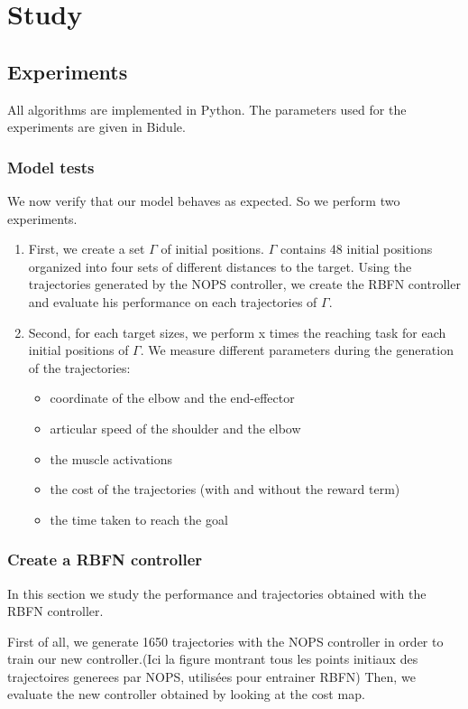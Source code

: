 \documentclass[pdftex,a4paper,11pt]{report}
\begin{document}
\chapter{Study}
\section{Experiments}
All algorithms are implemented in Python. The parameters used for the experiments are given in Bidule.

\subsection{Model tests}
We now verify that our model behaves as expected. So we perform two experiments.
\begin{enumerate}
\item First, we create a set $\Gamma$ of initial positions. $\Gamma$ contains 48 initial positions organized into four sets of different distances to the target.
Using the trajectories generated by the NOPS controller, we create the RBFN controller and evaluate his performance on each trajectories of $\Gamma$.
\item Second, for each target sizes, we perform x times the reaching task for each initial positions of $\Gamma$. We measure different parameters during the generation of the trajectories:
\begin{itemize}
\item coordinate of the elbow and the end-effector
\item articular speed of the shoulder and the elbow
\item the muscle activations
\item the cost of the trajectories (with and without the reward term)
\item the time taken to reach the goal
\end{itemize}
\end{enumerate}

\subsection{Create a RBFN controller}
In this section we study the performance and trajectories obtained with the RBFN controller.

First of all, we generate 1650 trajectories with the NOPS controller in order to train our new controller.(Ici la figure montrant tous les points initiaux des trajectoires generees par NOPS, utilisées pour entrainer RBFN)
Then, we evaluate the new controller obtained by looking at the cost map.
\end{document}
